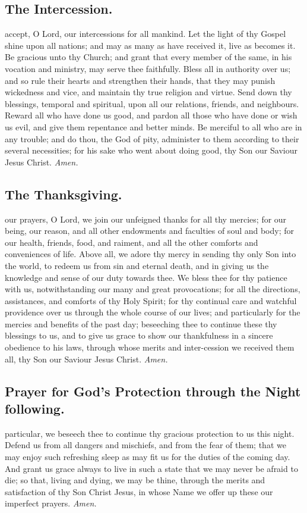 \subsection{The Intercession.}
 accept, O Lord, our intercessions for all mankind. Let the light of thy Gospel shine upon all nations; and may as many as have received it, live as becomes it. Be gracious unto thy Church; and grant that every member of the same, in his vocation and ministry, may serve thee faithfully. Bless all in authority over us; and so rule their hearts and strengthen their hands, that they may punish wickedness and vice, and maintain thy true religion and virtue. Send down thy blessings, temporal and spiritual, upon all our relations, friends, and neighbours. Reward all who have done us good, and pardon all those who have done or wish us evil, and give them repentance and better minds. Be merciful to all who are in any trouble; and do thou, the God of pity, administer to them according to their several necessities; for his sake who went about doing good, thy Son our Saviour Jesus Christ. \textit{Amen.}
\subsection{The Thanksgiving.}
 our prayers, O Lord, we join our unfeigned thanks for all thy mercies; for our being, our reason, and all other endowments and faculties of soul and body; for our health, friends, food, and raiment, and all the other comforts and conveniences of life. Above all, we adore thy mercy in sending thy only Son into the world, to redeem us from sin and eternal death, and in giving us the knowledge and sense of our duty towards thee. We bless thee for thy patience with us, notwithstanding our many and great provocations; for all the directions, assistances, and comforts of thy Holy Spirit; for thy continual care and watchful providence over us through the whole course of our lives; and particularly for the mercies and benefits of the past day; beseeching thee to continue these thy blessings to us, and to give us grace to show our thankfulness in a sincere obedience to his laws, through whose merits and inter-cession we received them all, thy Son our Saviour Jesus Christ. \textit{Amen.}
\subsection{Prayer for God's Protection through the Night following.}
 particular, we beseech thee to continue thy gracious protection to us this night. Defend us from all dangers and mischiefs, and from the fear of them; that we may enjoy such refreshing sleep as may fit us for the duties of the coming day. And grant us grace always to live in such a state that we may never be afraid to die; so that, living and dying, we may be thine, through the merits and satisfaction of thy Son Christ Jesus, in whose Name we offer up these our imperfect prayers. \textit{Amen.}

